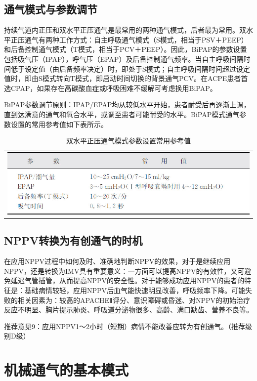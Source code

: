 \subsection{通气模式与参数调节}

持续气道内正压和双水平正压通气是最常用的两种通气模式，后者最为常用。双水平正压通气有两种工作方式：自主呼吸通气模式（S模式，相当于PSV＋PEEP）和后备控制通气模式（T模式，相当于PCV＋PEEP）。因此，BiPAP的参数设置包括吸气压（IPAP），呼气压（EPAP）及后备控制通气频率。当自主呼吸间隔时间低于设定值（由后备频率决定）时，即处于S模式；自主呼吸间隔时间超过设定值时，即由S模式转向T模式，即启动时间切换的背景通气PCV。在ACPE患者首选CPAP，如果存在高碳酸血症或呼吸困难不缓解可考虑换用BiPAP。

BiPAP参数调节原则：IPAP/EPAP均从较低水平开始，患者耐受后再逐渐上调，直到达满意的通气和氧合水平，或调至患者可能耐受的水平。BiPAP模式通气参数设置的常用参考值如下表所示。


\begin{longtable}{c}
  \caption{双水平正压通气模式参数设置常用参考值}
  \label{tabapp-4}
  \endfirsthead
  \caption[]{双水平正压通气模式参数设置常用参考值}
  \endhead
\centering\includegraphics[width=\textwidth,height=\textheight,keepaspectratio]{./images/Image00302.jpg}
\end{longtable}

\subsection{NPPV转换为有创通气的时机}

在应用NPPV过程中如何及时、准确地判断NPPV的效果，对于是继续应用NPPV，还是转换为IMV具有重要意义：一方面可以提高NPPV的有效性，又可避免延迟气管插管，从而提高NPPV的安全性。对于能够成功应用NPPV的患者的特征是：基础病情较轻，应用NPPV后血气能快速明显改善，呼吸频率下降。可能失败的相关因素为：较高的APACHEⅡ评分、意识障碍或昏迷、对NPPV的初始治疗反应不明显、胸片提示肺炎、呼吸道分泌物很多、高龄、满口缺齿、营养不良等。

推荐意见9：应用NPPV1～2小时（短期）病情不能改善应转为有创通气。（推荐级别D级）

\section{机械通气的基本模式}

